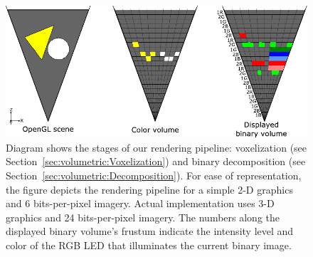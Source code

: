\begin{figure}[t]
\centering
\includegraphics[width=\columnwidth]{images/volumetric/binary_decomposition}
\caption[Volumetric NED: color volume to binary volume decomposition]{Diagram shows the stages of our rendering pipeline: voxelization (see Section~\ref{sec:volumetric:Voxelization}) and binary decomposition (see Section~\ref{sec:volumetric:Decomposition}). For ease of representation, the figure depicts the rendering pipeline for a simple 2-D graphics and 6 bits-per-pixel imagery. Actual implementation uses 3-D graphics and 24 bits-per-pixel imagery. The numbers along the displayed binary volume's frustum indicate the intensity level and color of the RGB LED that illuminates the current binary image.}
\label{fig:volumetric:binary_decomposition}
\end{figure}

